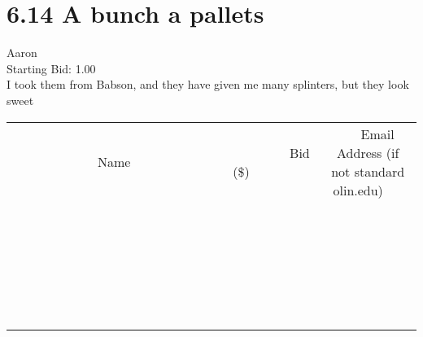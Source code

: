 \documentclass[11pt]{article}
\begin{document}
					\section*{6.14 A bunch a pallets}
					Aaron \\
					Starting Bid: 1.00 \\
					I took them from Babson, and they have given me many splinters, but they look sweet \\
					[6ex]
					\begin{tabular}{c c c}
						~~~~~~~~~~~~~Name~~~~~~~~~~~~~ & ~~~~~~~~~Bid (\$)~~~~~~~~~ & ~~~Email Address (if not standard olin.edu)~~~ \\
				
 & & \\
\hline
 & & \\
\hline
 & & \\
\hline
 & & \\
\hline
 & & \\
\hline
 & & \\
\hline
 & & \\
\hline
 & & \\
\hline
 & & \\
\hline
 & & \\
\hline
 & & \\
\hline
 & & \\
\hline
 & & \\
\hline
 & & \\
\hline
 & & \\
\hline
 & & \\
\hline
 & & \\
\hline
 & & \\
\hline
 & & \\
\hline
 & & \\
\hline
 & & \\
\hline
 & & \\
\hline
 & & \\
\hline
 & & \\
\hline
 & & \\
\hline
 & & \\
\hline
					\end{tabular}
					\clearpage
				
\end{document}
